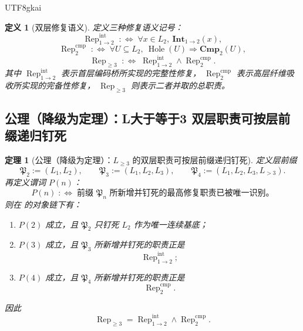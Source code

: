 \documentclass[12pt]{article}
\newtheorem{definition}{定义}[section]
\newtheorem{theorem}{定理}[section]
\newcommand{\Hole}{\operatorname{Hole}}
\begin{document}
\begin{CJK*}{UTF8}{gkai}
\begin{definition}[双层修复语义]
\label{def:tex1-ch11-repair}
定义三种修复语义记号：
\[
  \operatorname{Rep}^{\mathrm{int}}_{1\to2}
  \;:\Longleftrightarrow\;
  \forall x\in L_2,\ \mathbf{Int}_{1\to2}(x),
\]
\[
  \operatorname{Rep}^{\mathrm{cmp}}_{2}
  \;:\Longleftrightarrow\;
  \forall U\subseteq L_2,\ \Hole(U)\Rightarrow \mathbf{Cmp}_{2}(U),
\]
\[
  \operatorname{Rep}_{\ge3}
  \;:\Longleftrightarrow\;
  \operatorname{Rep}^{\mathrm{int}}_{1\to2}
  \wedge
  \operatorname{Rep}^{\mathrm{cmp}}_{2}.
\]
其中 \(\operatorname{Rep}^{\mathrm{int}}_{1\to2}\) 表示首层编码桥所实现的完整性修复，
\(\operatorname{Rep}^{\mathrm{cmp}}_{2}\) 表示高层纤维吸收所实现的完备性修复，
\(\operatorname{Rep}_{\ge3}\) 则表示二者并取的总职责。
\end{definition}

\subsection{公理（降级为定理）：L大于等于3 双层职责可按层前缀递归钉死}
\label{subsec:tex1-ch11-axiom}

\begin{theorem}[公理（降级为定理）：\(L_{\ge 3}\) 的双层职责可按层前缀递归钉死]
\label{thm:tex1-ch11-axiom-downgraded}
定义层前缀
\[
  \mathfrak P_2:=(L_1,L_2),\qquad
  \mathfrak P_3:=(L_1,L_2,L_3),\qquad
  \mathfrak P_4:=(L_1,L_2,L_3,L_{>3}).
\]
再定义谓词 \(P(n)\)：
\[
  P(n)
  \;:\Longleftrightarrow\;
  \text{前缀 }\mathfrak P_n\text{ 所新增并钉死的最高修复职责已被唯一识别。}
\]
则在 \cite{RepoTex41HomotopyRepairBundle} 的对象链下有：
\begin{enumerate}
  \item \(P(2)\) 成立，且 \(\mathfrak P_2\) 只钉死 \(L_2\) 作为唯一连续基底；
  \item \(P(3)\) 成立，且 \(\mathfrak P_3\) 所新增并钉死的职责正是
  \[
    \operatorname{Rep}^{\mathrm{int}}_{1\to2};
  \]
  \item \(P(4)\) 成立，且 \(\mathfrak P_4\) 所新增并钉死的职责正是
  \[
    \operatorname{Rep}^{\mathrm{cmp}}_{2}.
  \]
\end{enumerate}
因此
\[
  \boxed{
    \operatorname{Rep}_{\ge3}
    =
    \operatorname{Rep}^{\mathrm{int}}_{1\to2}
    \wedge
    \operatorname{Rep}^{\mathrm{cmp}}_{2}.
  }
\]
\end{theorem}


\end{CJK*}
\end{document}
